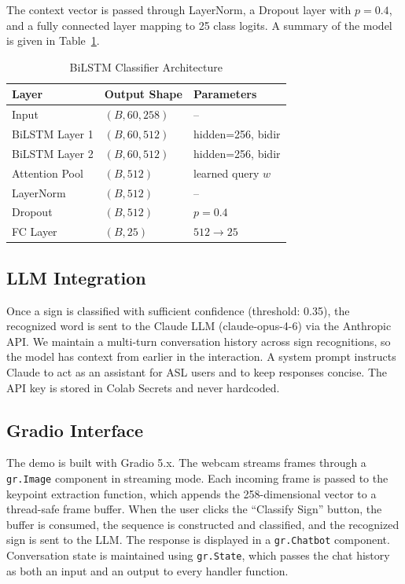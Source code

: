\documentclass[conference]{IEEEtran}
\begin{document}
The context vector is passed through LayerNorm, a Dropout layer with $p = 0.4$, and a fully connected layer mapping to 25 class logits. A summary of the model is given in Table~\ref{tab:arch}.

\begin{table}[htbp]
\caption{BiLSTM Classifier Architecture}
\centering
\begin{tabular}{lll}
\toprule
\textbf{Layer} & \textbf{Output Shape} & \textbf{Parameters} \\
\midrule
Input & $(B, 60, 258)$ & -- \\
BiLSTM Layer 1 & $(B, 60, 512)$ & hidden=256, bidir \\
BiLSTM Layer 2 & $(B, 60, 512)$ & hidden=256, bidir \\
Attention Pool & $(B, 512)$ & learned query $w$ \\
LayerNorm & $(B, 512)$ & -- \\
Dropout & $(B, 512)$ & $p = 0.4$ \\
FC Layer & $(B, 25)$ & $512 \to 25$ \\
\bottomrule
\end{tabular}
\label{tab:arch}
\end{table}

\subsection{LLM Integration}

Once a sign is classified with sufficient confidence (threshold: 0.35), the recognized word is sent to the Claude LLM (claude-opus-4-6) via the Anthropic API. We maintain a multi-turn conversation history across sign recognitions, so the model has context from earlier in the interaction. A system prompt instructs Claude to act as an assistant for ASL users and to keep responses concise. The API key is stored in Colab Secrets and never hardcoded.

\subsection{Gradio Interface}

The demo is built with Gradio 5.x. The webcam streams frames through a \texttt{gr.Image} component in streaming mode. Each incoming frame is passed to the keypoint extraction function, which appends the 258-dimensional vector to a thread-safe frame buffer. When the user clicks the ``Classify Sign'' button, the buffer is consumed, the sequence is constructed and classified, and the recognized sign is sent to the LLM. The response is displayed in a \texttt{gr.Chatbot} component. Conversation state is maintained using \texttt{gr.State}, which passes the chat history as both an input and an output to every handler function.
\end{document}
